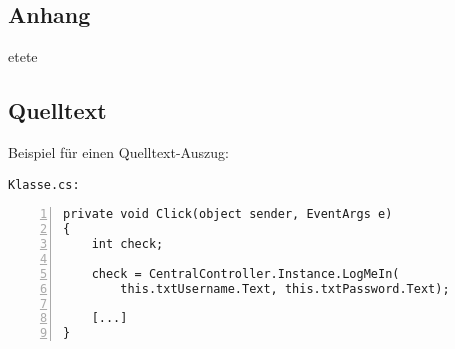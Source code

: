 
\begin{appendices}
\renewcommand{\appendixname}{ANHANG}
\renewcommand{\appendixtocname}{\appendixname} 
\addappheadtotoc 


\part*{Anhang}

% 
etete

\chapter*{Quelltext}

Beispiel für einen Quelltext-Auszug:

\texttt{Klasse.cs:}
\begin{lstlisting}[basicstyle=\ttfamily,numbers=left,numberstyle=\footnotesize\ttfamily,backgroundcolor=\color{sourcegray}]
private void Click(object sender, EventArgs e)
{
    int check;
        
    check = CentralController.Instance.LogMeIn(
        this.txtUsername.Text, this.txtPassword.Text);
    
    [...]	
}
\end{lstlisting}

\end{appendices}